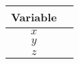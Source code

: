 \begin{tabular}{|c|c|}
\hline
\textbf{Variable} \\
\hline
$x$ \\
\hline
$y$ \\
\hline
$z$\\
\hline
\end{tabular}